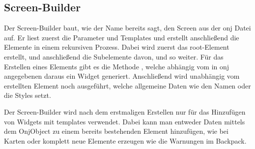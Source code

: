 
\renewcommand{\kapitelautor}{Autor: Felix Zwickelstorfer}
\subsection{Screen-Builder}\label{sec:screen-builder}
\renewcommand{\kapitelautor}{Autor: Felix Zwickelstorfer}
Der Screen-Builder baut, wie der Name bereits sagt, den Screen aus der onj Datei auf.
Er liest zuerst die Parameter und Templates und erstellt anschließend die Elemente in einem rekursiven Prozess.
Dabei wird zuerst das root-Element erstellt, und anschließend die Subelemente davon, und so weiter.
Für das Erstellen eines Elements gibt es die Methode , welche abhängig vom in onj angegebenen  daraus ein Widget generiert.
Anschließend wird unabhängig vom erstellten Element noch  ausgeführt, welche allgemeine Daten wie \zB den Namen oder die Styles setzt.

Der Screen-Builder wird nach dem erstmaligen Erstellen nur für das Hinzufügen von Widgets mit templates verwendet.
Dabei kann man entweder Daten mittels dem  OnjObject zu einem bereits bestehenden Element hinzufügen, wie \zB bei Karten oder komplett neue Elemente erzeugen wie die Warnungen im Backpack.
